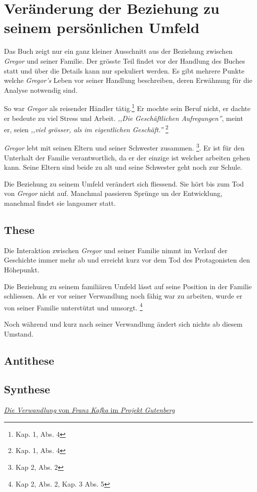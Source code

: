 \documentclass[12pt,a4paper,twoside,titlepage]{article}
\begin{document}
	
	
	\section{Veränderung der Beziehung zu seinem persönlichen Umfeld}
	Das Buch zeigt nur ein ganz kleiner Ausschnitt aus der Beziehung zwischen \textit{Gregor} und seiner Familie. Der grösste Teil findet vor der Handlung des Buches statt und über die Details kann nur spekuliert werden. Es gibt mehrere Punkte welche \textit{Gregor's} Leben vor seiner Handlung beschreiben, deren Erwähnung für die Analyse notwendig sind.
	
	So war \textit{Gregor} als reisender Händler tätig.\footnote{Kap. 1, Abs. 4} Er mochte sein Beruf nicht, er dachte er bedeute zu viel Stress und Arbeit. \textit{,,Die Geschäftlichen Aufregungen''}, meint er, seien \textit{,,viel grösser, als im eigentlichen Geschäft.''} \footnote{Kap. 1, Abs. 4}
	
	\textit{Gregor} lebt mit seinen Eltern und seiner Schwester zusammen. \footnote{Kap 2, Abs. 2}. Er ist für den Unterhalt der Familie verantwortlich, da er der einzige ist welcher arbeiten gehen kann. Seine Eltern sind beide zu alt und seine Schwester geht noch zur Schule.
	
	Die Beziehung zu seinem Umfeld verändert sich fliessend. Sie hört bis zum Tod von \textit{Gregor} nicht auf. Manchmal passieren Sprünge un der Entwicklung, manchmal findet sie langsamer statt. 
	
	\subsection{These}
	
	Die Interaktion zwischen \textit{Gregor} und seiner Familie nimmt im Verlauf der Geschichte immer mehr ab und erreicht kurz vor dem Tod des Protagonisten den Höhepunkt.

	Die Beziehung zu seinem familiären Umfeld lässt auf seine Position in der Familie schliessen. Als er vor seiner Verwandlung noch fähig war zu arbeiten, wurde er von seiner Familie unterstützt und umsorgt. \footnote{Kap 2, Abs. 2, Kap. 3 Abs. 5}

	Noch während und kurz nach seiner Verwandlung ändert sich nichts ab diesem Umstand.
	
	

	\subsection{Antithese}
	
	
	
	\subsection{Synthese}
	
	
	
	\begin{thebibliography}{9}
		 \href{http://gutenberg.spiegel.de/buch/die-verwandlung-165/1}{\textit{Die Verwandlung} von \textit{Franz Kafka} im \textit{Projekt Gutenberg}}
		
%			
	\end{thebibliography}
	
	
	
	
\end{document}
